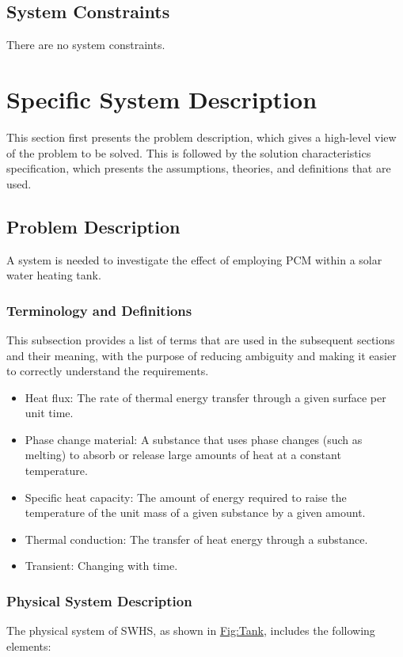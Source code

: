 \documentclass[12pt]{article}
\begin{document}
\subsection{System Constraints}
\label{Sec:SysConstraints}
There are no system constraints.

\section{Specific System Description}
\label{Sec:SpecSystDesc}
This section first presents the problem description, which gives a high-level view of the problem to be solved. This is followed by the solution characteristics specification, which presents the assumptions, theories, and definitions that are used.

\subsection{Problem Description}
\label{Sec:ProbDesc}
A system is needed to investigate the effect of employing PCM within a solar water heating tank.

\subsubsection{Terminology and Definitions}
\label{Sec:TermDefs}
This subsection provides a list of terms that are used in the subsequent sections and their meaning, with the purpose of reducing ambiguity and making it easier to correctly understand the requirements.

\begin{itemize}
\item{Heat flux: The rate of thermal energy transfer through a given surface per unit time.}
\item{Phase change material: A substance that uses phase changes (such as melting) to absorb or release large amounts of heat at a constant temperature.}
\item{Specific heat capacity: The amount of energy required to raise the temperature of the unit mass of a given substance by a given amount.}
\item{Thermal conduction: The transfer of heat energy through a substance.}
\item{Transient: Changing with time.}
\end{itemize}
\subsubsection{Physical System Description}
\label{Sec:PhysSyst}
The physical system of SWHS, as shown in \hyperref[Figure:Tank]{Fig:Tank}, includes the following elements:
\end{document}
